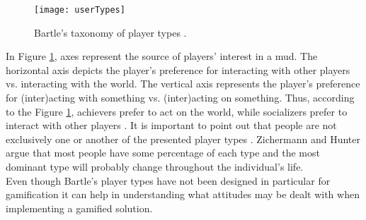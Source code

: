 \begin{figure}[h]
    \centering
    \texttt{[image: userTypes]}
    \caption{Bartle's taxonomy of player types \cite{bartle}.}
    \label{fig:userTypes}
\end{figure}
In Figure \ref{fig:userTypes}, axes represent the source of players' interest in a \acrshort{mud}. The horizontal axis depicts the player's preference for interacting with other players vs. interacting with the world. The vertical axis represents the player's preference for (inter)acting with something vs. (inter)acting on something. Thus, according to the Figure \ref{fig:userTypes}, achievers prefer to act on the world, while socializers prefer to interact with other players \cite{bartle}. It is important to point out that people are not exclusively one or another of the presented player types \cite{zichermann2011gamification}. Zichermann and Hunter \cite{zichermann2011gamification} argue that most people have some percentage of each type and the most dominant type will probably change throughout the individual's life.\\ Even though Bartle's player types have not been designed in particular for gamification it can help in understanding what attitudes may be dealt with when implementing a gamified solution. 
